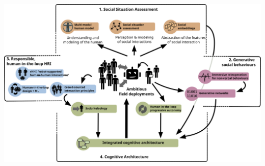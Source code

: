 \documentclass[xcolor=table]{beamer}
\makeatletter
\def\beamer@writeslidentry@miniframesoff{%
  \expandafter\beamer@ifempty\expandafter{\beamer@framestartpage}{}%
  {%
    \clearpage\beamer@notesactions%
  }
}
\newcommand*{\miniframesoff}{\let\beamer@writeslidentry=\beamer@writeslidentry@miniframesoff}
\makeatother
\begin{document}
\begin{frame}
\begin{center}
{        \includegraphics[trim=8cm 0 8cm 16cm,clip,width=\linewidth]{architectures/wps}
    }
    \end{center}
\end{frame}

\miniframesoff{}
\end{document}
